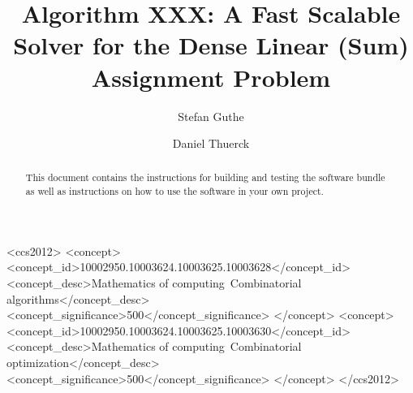 \documentclass[format=acmsmall,review=false, screen=true]{acmart}
\begin{document}
\title[Algorithm XXX: A Fast Scalable Solver for the Dense Linear (Sum) Assignment Problem]{Algorithm XXX: A Fast Scalable Solver for the Dense Linear (Sum) Assignment Problem}

\author{Stefan Guthe}

\author{Daniel Thuerck}


\renewcommand\shortauthors{Guthe, S., Thuerck, D.}

\begin{abstract}
This document contains the instructions for building and testing the software bundle as well as instructions on how to use the software in your own project.
\end{abstract}

%
%
 \begin{CCSXML}
<ccs2012>
<concept>
<concept_id>10002950.10003624.10003625.10003628</concept_id>
<concept_desc>Mathematics of computing~Combinatorial algorithms</concept_desc>
<concept_significance>500</concept_significance>
</concept>
<concept>
<concept_id>10002950.10003624.10003625.10003630</concept_id>
<concept_desc>Mathematics of computing~Combinatorial optimization</concept_desc>
<concept_significance>500</concept_significance>
</concept>
</ccs2012>
\end{CCSXML}

%
%


\maketitle
\end{document}
